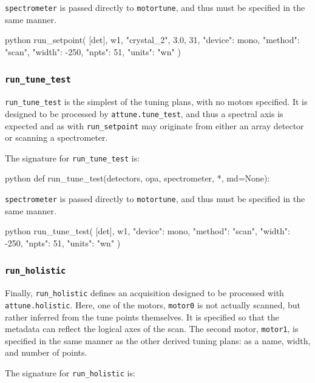 \texttt{spectrometer} is passed directly to \texttt{motortune}, and thus must be specified in the same manner.

\begin{codefragment}{python}
run_setpoint(
    [det],
    w1,
    "crystal_2",
    3.0,
    31,
    {"device": mono, "method": "scan", "width": -250, "npts": 51, "units": "wn"}
)
\end{codefragment}

\subsubsection{\texttt{run\_tune\_test}}

\texttt{run\_tune\_test} is the simplest of the tuning plans, with no motors specified.
It is designed to be processed by \texttt{attune.tune\_test}, and thus a spectral axis is expected and as with \texttt{run\_setpoint} may originate from either an array detector or scanning a spectrometer.

The signature for \texttt{run\_tune\_test} is:

\begin{codefragment}{python}
def run_tune_test(detectors, opa, spectrometer, *, md=None):
\end{codefragment}

\texttt{spectrometer} is passed directly to \texttt{motortune}, and thus must be specified in the same manner.

\begin{codefragment}{python}
run_tune_test(
    [det],
    w1,
    {"device": mono, "method": "scan", "width": -250, "npts": 51, "units": "wn"}
)
\end{codefragment}

\subsubsection{\texttt{run\_holistic}}

Finally, \texttt{run\_holistic} defines an acquisition designed to be processed with \texttt{attune.holistic}.
Here, one of the motors, \texttt{motor0} is not actually scanned, but rather inferred from the tune points themselves.
It is specified so that the metadata can reflect the logical axes of the scan.
The second motor, \texttt{motor1}, is specified in the same manner as the other derived tuning plans: as a name, width, and number of points.

The signature for \texttt{run\_holistic} is:

